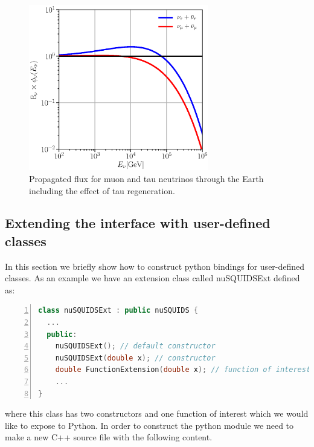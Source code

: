 \documentclass[3p,12pt]{elsarticle}
\newcommand{\ttf}{\ttfamily}
\begin{document}
\begin{figure}[h!]
  \label{fig:nusquids_atm_python_with_interaction}
  \centering
  \includegraphics[width=0.7\textwidth]{fig/nusquids_python_with_interactions_both.eps} 
  \caption{Propagated flux for muon and tau neutrinos through the Earth including the effect of tau regeneration.}
\end{figure}

\subsection{Extending the interface with user-defined classes~\label{sec:python_extensions}}

In this section we briefly show how to construct python bindings for user-defined classes. As an example
we have an extension class called {\ttf nuSQUIDSExt} defined as:

\begin{lstlisting}[language=C++, frame=leftline, numbers=left, breaklines=true]
class nuSQUIDSExt : public nuSQUIDS {
  ...
  public:
    nuSQUIDSExt(); // default constructor
    nuSQUIDSExt(double x); // constructor
    double FunctionExtension(double x); // function of interest
    ...
}
\end{lstlisting}
where this class has two constructors and one function of interest which we would like to expose to {\ttf Python}.
In order to construct the python module we need to make a new C++ source file with the following content.
\end{document}
